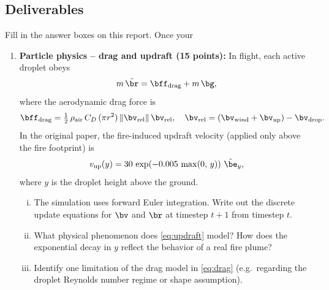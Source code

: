 \documentclass{article}
\begin{document}
\subsection*{Deliverables}
Fill in the answer boxes on this report. Once your 
\begin{enumerate}


\item[1.] \textbf{Particle physics -- drag and updraft (15 points):}
In flight, each active droplet obeys
\begin{equation}
    m\,\ddot{\br} = \bff_\text{drag} + m\,\bg,
    \label{eq:eom}
\end{equation}
where the aerodynamic drag force is
\begin{equation}
    \bff_\text{drag} = \tfrac{1}{2}\,\rho_\text{air}\,C_D\,(\pi r^2)\,\|\bv_\text{rel}\|\,\bv_\text{rel},
    \quad \bv_\text{rel} = (\bv_\text{wind} + \bv_\text{up}) - \bv_\text{drop}.
    \label{eq:drag}
\end{equation}
In the original paper, the fire-induced updraft velocity (applied only above the fire footprint) is
\begin{equation}
    v_\text{up}(y) = 30\,\exp\!\left(-0.005\,\max(0,\,y)\right)\,\hat{\be}_y,
    \label{eq:updraft}
\end{equation}
where $y$ is the droplet height above the ground.

\begin{enumerate}[(i)]
    \item The simulation uses forward Euler integration. Write out the discrete update equations for $\bv$ and $\br$ at timestep $t+1$ from timestep $t$.
    \item What physical phenomenon does \cref{eq:updraft} model? How does the exponential decay in $y$ reflect the behavior of a real fire plume?
    \item Identify one limitation of the drag model in \cref{eq:drag} (e.g.\ regarding the droplet Reynolds number regime or shape assumption).
\end{enumerate}

\begin{answer}
\end{answer}




\end{enumerate}
\end{document}
